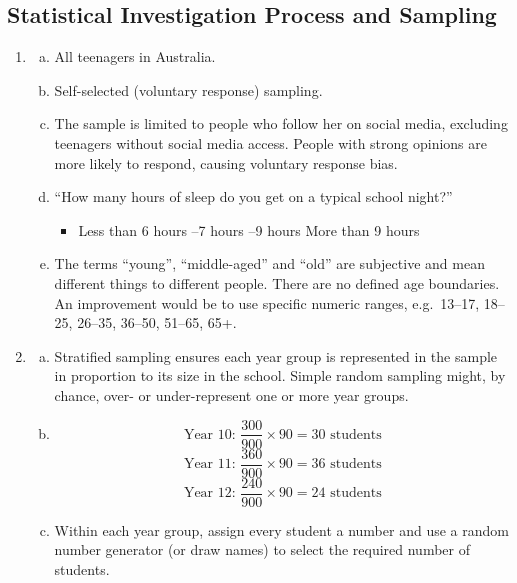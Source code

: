 \documentclass{article}
\begin{document}
\subsection{Statistical Investigation Process and Sampling}
\begin{enumerate}

  \item
  \begin{enumerate}[(a)]
    \item All teenagers in Australia.
    \item Self-selected (voluntary response) sampling.
    \item The sample is limited to people who follow her on social media, excluding teenagers
    without social media access. People with strong opinions are more likely to respond,
    causing voluntary response bias.
    \item ``How many hours of sleep do you get on a typical school night?''
    \begin{itemize}
      \item Less than 6 hours --7 hours --9 hours \quad More than 9 hours
    \end{itemize}
    \item The terms ``young'', ``middle-aged'' and ``old'' are subjective and mean different
    things to different people. There are no defined age boundaries. An improvement would be
    to use specific numeric ranges, e.g.\ 13--17, 18--25, 26--35, 36--50, 51--65, 65+.
  \end{enumerate}

  \item
  \begin{enumerate}[(a)]
    \item Stratified sampling ensures each year group is represented in the sample in
    proportion to its size in the school. Simple random sampling might, by chance,
    over- or under-represent one or more year groups.
    \item
    \[
      \text{Year 10: } \frac{300}{900} \times 90 = 30 \text{ students}
    \]
    \[
      \text{Year 11: } \frac{360}{900} \times 90 = 36 \text{ students}
    \]
    \[
      \text{Year 12: } \frac{240}{900} \times 90 = 24 \text{ students}
    \]
    \item Within each year group, assign every student a number and use a random number
    generator (or draw names) to select the required number of students.
  \end{enumerate}


\end{enumerate}
\end{document}
